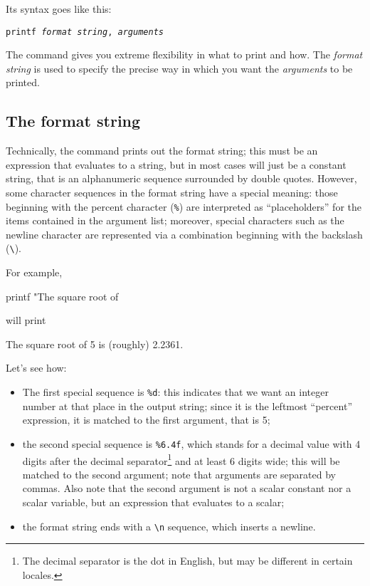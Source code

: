 Its syntax goes like this:
\begin{flushleft}
  \texttt{printf \emph{format string}, \emph{arguments}}
\end{flushleft}

The  command gives you extreme flexibility in what to
print and how. The \emph{format string} is used to specify the precise
way in which you want the \emph{arguments} to be printed.

\subsection{The format string}
\label{sec:fmtstring}

Technically, the  command prints out the format string;
this must be an expression that evaluates to a string, but in most
cases will just be a constant string, that is an alphanumeric sequence
surrounded by double quotes. However, some character sequences in the
format string have a special meaning: those beginning with the percent
character (\texttt{\%}) are interpreted as ``placeholders'' for the
items contained in the argument list; moreover, special characters
such as the newline character are represented via a combination
beginning with the backslash (\verb|\|).

For example,
\begin{code}
printf "The square root of %
\end{code}
will print 
\begin{code}
The square root of 5 is (roughly) 2.2361.
\end{code}

Let's see how:
\begin{itemize}
\item The first special sequence is \verb|%d|: this indicates that we
  want an integer number at that place in the output string; since it
  is the leftmost ``percent'' expression, it is matched to the first
  argument, that is 5;
\item the second special sequence is \verb|%6.4f|, which stands for a
  decimal value with 4 digits after the decimal separator\footnote{The
    decimal separator is the dot in English, but may be different in
    certain locales.} and at least 6 digits wide; this will be matched
  to the second argument; note that arguments are separated by
  commas. Also note that the second argument is not a scalar constant
  nor a scalar variable, but an expression that evaluates to a scalar;
\item the format string ends with a \verb|\n| sequence, which inserts
  a newline.
\end{itemize}

